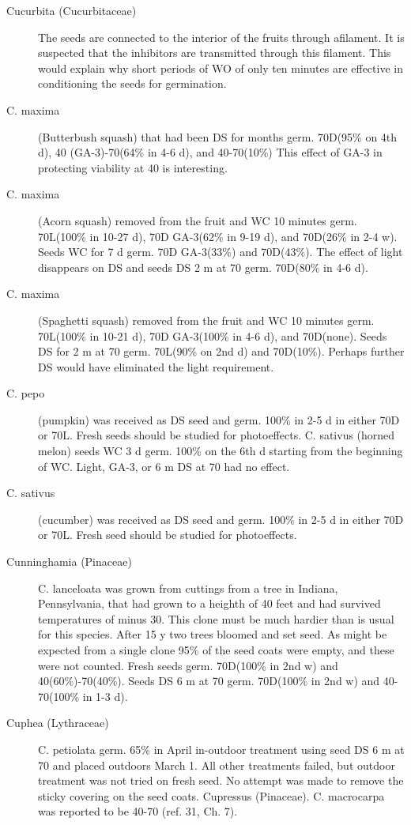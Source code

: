 \begin{description}
\item[Cucurbita (Cucurbitaceae)] The seeds are connected to the interior of the
fruits through afilament. It is suspected that the inhibitors are transmitted through this
filament. This would explain why short periods of WO of only ten minutes are effective
in conditioning the seeds for germination.
\item[C. maxima] (Butterbush squash) that had been DS for months germ. 70D(95\%
on 4th d), 40 (GA-3)-70(64\% in 4-6 d), and 40-70(10\%) This effect of GA-3 in
protecting viability at 40 is interesting.
\item[C. maxima] (Acorn squash) removed from the fruit and WC 10 minutes germ.
70L(100\% in 10-27 d), 70D GA-3(62\% in 9-19 d), and 70D(26\% in 2-4 w). Seeds WC
for 7 d germ. 70D GA-3(33\%) and 70D(43\%). The effect of light disappears on DS and
seeds DS 2 m at 70 germ. 70D(80\% in 4-6 d).
\item[C. maxima] (Spaghetti squash) removed from the fruit and WC 10 minutes germ.
70L(100\% in 10-21 d), 70D GA-3(100\% in 4-6 d), and 70D(none). Seeds DS for 2 m
at 70 germ. 70L(90\% on 2nd d) and 70D(10\%). Perhaps further DS would have
eliminated the light requirement.
\item[C. pepo] (pumpkin) was received as DS seed and germ. 100\% in 2-5 d in either
70D or 70L. Fresh seeds should be studied for photoeffects.
C. sativus (horned melon) seeds WC 3 d germ. 100\% on the 6th d starting from
the beginning of WC. Light, GA-3, or 6 m DS at 70 had no effect.
\item[C. sativus] (cucumber) was received as DS seed and germ. 100\% in 2-5 d in
either 70D or 70L. Fresh seed should be studied for photoeffects.

\item[Cunninghamia (Pinaceae)] C. lanceloata was grown from cuttings from a
tree in Indiana, Pennsylvania, that had grown to a heighth of 40 feet and had survived
temperatures of minus 30. This clone must be much hardier than is usual for this
species. After 15 y two trees bloomed and set seed. As might be expected from a
single clone 95\% of the seed coats were empty, and these were not counted. Fresh
seeds germ. 70D(100\% in 2nd w) and 40(60\%)-70(40\%). Seeds DS 6 m at 70 germ.
70D(100\% in 2nd w) and 40-70(100\% in 1-3 d).

\item[Cuphea (Lythraceae)] C. petiolata germ. 65\% in April in-outdoor treatment
using seed DS 6 m at 70 and placed outdoors March 1. All other treatments failed, but
outdoor treatment was not tried on fresh seed. No attempt was made to remove the
sticky covering on the seed coats.
Cupressus (Pinaceae). C. macrocarpa was reported to be 40-70 (ref. 31, Ch. 7).


\end{description}
